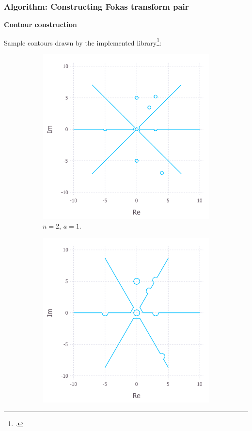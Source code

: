 \documentclass{beamer}
\begin{document}
\begin{frame}[t]
    \frametitle{Algorithm: Constructing Fokas transform pair}
    \textbf{Contour construction}

    Sample contours drawn by the implemented library\footcite{Xiao}:
    \begin{figure}
        \begin{subfigure}{.45\textwidth}
            \centering
            \includegraphics[width=1\linewidth]{contourPlot_n=2_a=1_cropped.pdf}
            \caption{$n=2$, $a=1$.}
        \end{subfigure}%
        \begin{subfigure}{.45\textwidth}
            \centering
            \includegraphics[width=1\linewidth]{contourPlot_n=3_a=-i_cropped.pdf}

\end{subfigure}
\end{figure}
\end{frame}
\end{document}
